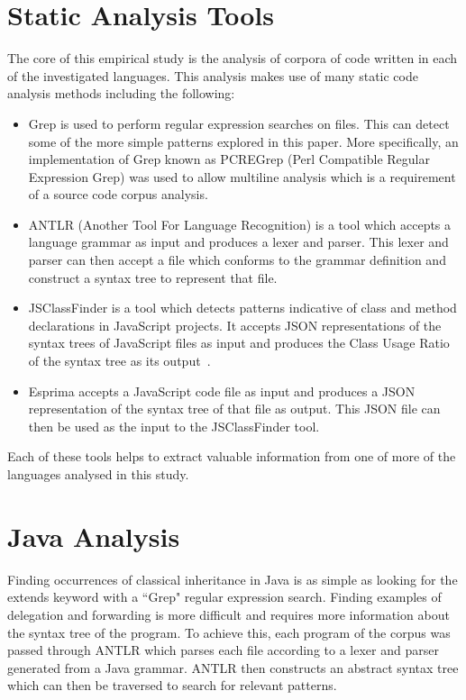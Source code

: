 \section{Static Analysis Tools}
The core of this empirical study is the analysis of corpora of code written in each of the investigated languages. This analysis makes use of many static code analysis methods including the following:
\begin{itemize}
	\item Grep is used to perform regular expression searches on files. This can detect some of the more simple patterns explored in this paper. More specifically, an implementation of Grep known as PCREGrep (Perl Compatible Regular Expression Grep) was used to allow multiline analysis which is a requirement of a source code corpus analysis.
	\item ANTLR (Another Tool For Language Recognition) is a tool which accepts a language grammar as input and produces a lexer and parser. This lexer and parser can then accept a file which conforms to the grammar definition and construct a syntax tree to represent that file.
	\item JSClassFinder is a tool which detects patterns indicative of class and method declarations in JavaScript projects. It accepts JSON representations of the syntax trees of JavaScript files as input and produces the Class Usage Ratio of the syntax tree as its output~\cite{JSClassFinder}.
	\item Esprima accepts a JavaScript code file as input and produces a JSON representation of the syntax tree of that file as output. This JSON file can then be used as the input to the JSClassFinder tool.
\end{itemize}
Each of these tools helps to extract valuable information from one of more of the languages analysed in this study.

\section{Java Analysis}
Finding occurrences of classical inheritance in Java is as simple as looking for the extends keyword with a ``Grep" regular expression search. Finding examples of delegation and forwarding is more difficult and requires more information about the syntax tree of the program. To achieve this, each program of the corpus was passed through ANTLR which parses each file according to a lexer and parser generated from a Java grammar. ANTLR then constructs an abstract syntax tree which can then be traversed to search for relevant patterns.
\newline

